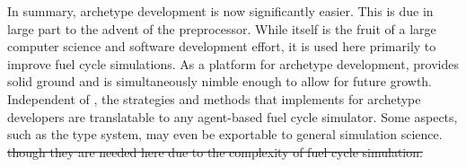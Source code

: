 In summary, archetype development is now significantly easier. This is due in large
part to the advent of the \cyclus preprocessor. While \cycpp itself is the fruit of
a large computer science and software development effort, it is used here 
primarily to improve fuel cycle simulations. As a platform for archetype
development, \cyclus provides solid ground and is simultaneously nimble enough
to allow for future growth. Independent of \cyclus, the strategies and methods that
\cyclus implements for archetype developers are translatable to any agent-based 
fuel cycle simulator.  Some aspects, such as the type system,  may even be exportable 
to general simulation science. \sout{ though they are needed here due to the complexity of 
fuel cycle simulation.}

